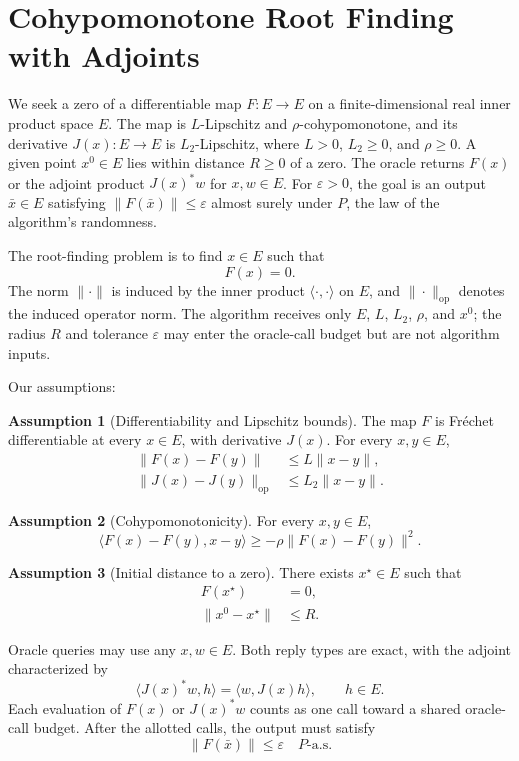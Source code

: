 \documentclass[10pt]{article}
\theoremstyle{definition}
\newtheorem{assumption}{Assumption}
\begin{document}
\section*{Cohypomonotone Root Finding with Adjoints}
We seek a zero of a differentiable map $F:E\to E$ on a finite-dimensional real inner product space $E$. The map is $L$-Lipschitz and $\rho$-cohypomonotone, and its derivative $J(x):E\to E$ is $L_2$-Lipschitz, where $L>0$, $L_2\geq0$, and $\rho\geq0$. A given point $x^0\in E$ lies within distance $R\geq0$ of a zero. The oracle returns $F(x)$ or the adjoint product $J(x)^*w$ for $x,w\in E$. For $\varepsilon>0$, the goal is an output $\bar{x}\in E$ satisfying $\|F(\bar{x})\|\leq\varepsilon$ almost surely under $P$, the law of the algorithm's randomness.

The root-finding problem is to find $x\in E$ such that
\[
F(x)=0.
\]
The norm $\|\cdot\|$ is induced by the inner product $\langle\cdot,\cdot\rangle$ on $E$, and $\|\cdot\|_{\mathrm{op}}$ denotes the induced operator norm. The algorithm receives only $E$, $L$, $L_2$, $\rho$, and $x^0$; the radius $R$ and tolerance $\varepsilon$ may enter the oracle-call budget but are not algorithm inputs.

Our assumptions:
\begin{assumption}[Differentiability and Lipschitz bounds]
The map $F$ is Fr\'echet differentiable at every $x\in E$, with derivative $J(x)$. For every $x,y\in E$,
\[
\begin{aligned}
\|F(x)-F(y)\|&\leq L\|x-y\|,\\
\|J(x)-J(y)\|_{\mathrm{op}}&\leq L_2\|x-y\|.
\end{aligned}
\]
\end{assumption}

\begin{assumption}[Cohypomonotonicity]
For every $x,y\in E$,
\[
\langle F(x)-F(y),x-y\rangle
\geq -\rho\|F(x)-F(y)\|^2.
\]
\end{assumption}

\begin{assumption}[Initial distance to a zero]
There exists $x^\star\in E$ such that
\[
\begin{aligned}
F(x^\star)&=0,\\
\|x^0-x^\star\|&\leq R.
\end{aligned}
\]
\end{assumption}

Oracle queries may use any $x,w\in E$. Both reply types are exact, with the adjoint characterized by
\[
\langle J(x)^*w,h\rangle=\langle w,J(x)h\rangle,
\qquad h\in E.
\]
Each evaluation of $F(x)$ or $J(x)^*w$ counts as one call toward a shared oracle-call budget. After the allotted calls, the output must satisfy
\[
\|F(\bar{x})\|\leq\varepsilon
\quad P\text{-a.s.}
\]
\end{document}
